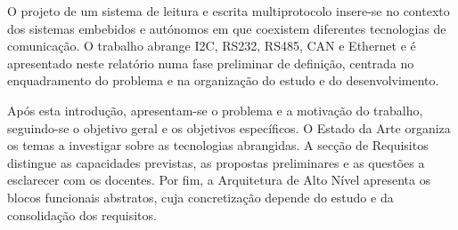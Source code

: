 O projeto de um sistema de leitura e escrita multiprotocolo insere-se
no contexto dos sistemas embebidos e autónomos em que coexistem diferentes
tecnologias de comunicação. O trabalho abrange I2C, RS232, RS485, CAN e
Ethernet e é apresentado neste relatório numa fase preliminar de definição,
centrada no enquadramento do problema e na organização do estudo e do
desenvolvimento.

Após esta introdução, apresentam-se o problema e a motivação do trabalho,
seguindo-se o objetivo geral e os objetivos específicos. O Estado da Arte
organiza os temas a investigar sobre as tecnologias abrangidas. A secção
de Requisitos distingue as capacidades previstas, as propostas preliminares
e as questões a esclarecer com os docentes. Por fim, a Arquitetura de Alto
Nível apresenta os blocos funcionais abstratos, cuja concretização depende
do estudo e da consolidação dos requisitos.
